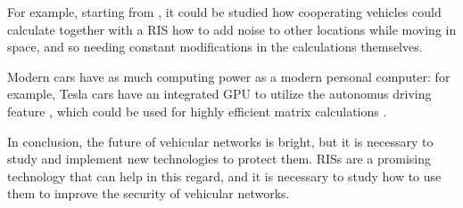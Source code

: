For example, starting from \cite{4543070}, it could be studied how cooperating vehicles could calculate together with a RIS how to add noise to other locations while moving in space, and so needing constant modifications in the calculations themselves.

Modern cars have as much computing power as a modern personal computer: for example, Tesla cars have an integrated GPU to utilize the autonomus driving feature \cite{10586734}, which could be used for highly efficient matrix calculations \cite{1011452699470}.

In conclusion, the future of vehicular networks is bright, but it is necessary to study and implement new technologies to protect them. RISs are a promising technology that can help in this regard, and it is necessary to study how to use them to improve the security of vehicular networks.